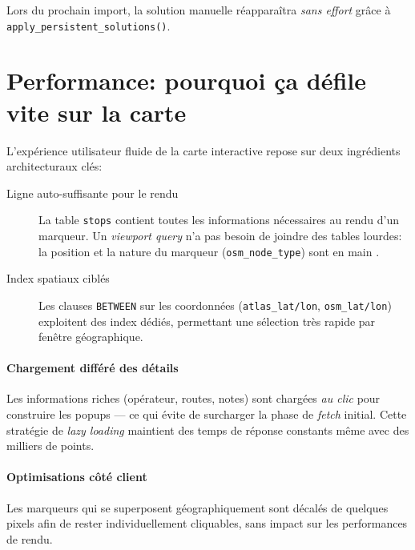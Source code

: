 \noindent
Lors du prochain import, la solution manuelle réapparaîtra \textit{sans effort} grâce à \texttt{apply\_persistent\_solutions()}.

\section{Performance: pourquoi ça défile vite sur la carte}

L'expérience utilisateur fluide de la carte interactive repose sur deux ingrédients architecturaux clés:

\begin{description}
  \item[Ligne auto-suffisante pour le rendu] La table \texttt{stops} contient toutes les informations nécessaires au rendu d'un marqueur. Un \textit{viewport query} n'a pas besoin de joindre des tables lourdes: la position et la nature du marqueur (\texttt{osm\_node\_type}) sont \og en main \fg{}.
  
  \item[Index spatiaux ciblés] Les clauses \texttt{BETWEEN} sur les coordonnées (\texttt{atlas\_lat/lon}, \texttt{osm\_lat/lon}) exploitent des index dédiés, permettant une sélection très rapide par fenêtre géographique.
\end{description}

\paragraph{Chargement différé des détails} Les informations riches (opérateur, routes, notes) sont chargées \textit{au clic} pour construire les popups — ce qui évite de surcharger la phase de \textit{fetch} initial. Cette stratégie de \textit{lazy loading} maintient des temps de réponse constants même avec des milliers de points.

\paragraph{Optimisations côté client} Les marqueurs qui se superposent géographiquement sont \og décalés \fg{} de quelques pixels afin de rester individuellement cliquables, sans impact sur les performances de rendu.



